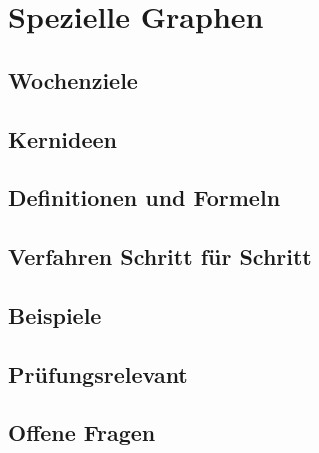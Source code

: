 \chapter{Spezielle Graphen}
\label{kap:12-spezielle-graphen}

\section*{Wochenziele}
\begin{wochenziele}
\end{wochenziele}

\section{Kernideen}

\section{Definitionen und Formeln}

\section{Verfahren Schritt für Schritt}

\section{Beispiele}

\section{Prüfungsrelevant}

\section{Offene Fragen}
